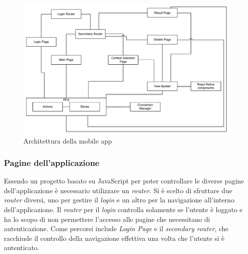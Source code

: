 \begin{figure}[h]
	\centering
	\includegraphics[width=\textwidth]{4-progettazione-alto-livello/Immagini/app_architecture.pdf}
	\caption{Architettura della mobile app}\label{fig:app-architecture}
\end{figure}

\subsubsection{Pagine dell'applicazione}

Essendo un progetto basato su JavaScript per poter controllare le diverse pagine dell'applicazione è necessario utilizzare un \emph{router}. Si è scelto di sfruttare due \emph{router} diversi, uno per gestire il \emph{login} e un altro per la navigazione all'interno dell'applicazione. Il \emph{router} per il \emph{login} controlla solamente se l'utente è loggato e ha lo scopo di non permettere l'accesso alle pagine che necessitano di autenticazione. Come percorsi include \emph{Login Page} e il \emph{secondary router}, che racchiude il controllo della navigazione effettiva una volta che l'utente si è autenticato.

